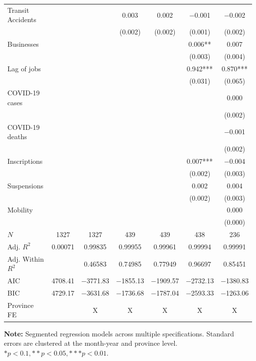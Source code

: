 \documentclass[11pt,a4paper]{article}\usepackage[]{graphicx}\usepackage[]{xcolor}
\begin{document}
\begin{table}[htbp!]
\begin{tabular}[t]{lcccccc}
Transit Accidents &  &  & \num{0.003} & \num{0.002} & \num{-0.001} & \num{-0.002}\\
 &  &  & (\num{0.002}) & (\num{0.002}) & (\num{0.001}) & (\num{0.002})\\
Businesses &  &  &  &  & \num{0.006}** & \num{0.007}\\
 &  &  &  &  & (\num{0.003}) & (\num{0.004})\\
Lag of jobs &  &  &  &  & \num{0.942}*** & \num{0.870}***\\
 &  &  &  &  & (\num{0.031}) & (\num{0.065})\\
COVID-19 cases &  &  &  &  &  & \num{0.000}\\
 &  &  &  &  &  & \vphantom{1} (\num{0.002})\\
COVID-19 deaths &  &  &  &  &  & \num{-0.001}\\
 &  &  &  &  &  & (\num{0.002})\\
Inscriptions &  &  &  &  & \num{0.007}*** & \num{-0.004}\\
 &  &  &  &  & (\num{0.002}) & \vphantom{1} (\num{0.003})\\
Suspensions &  &  &  &  & \num{0.002} & \num{0.004}\\
 &  &  &  &  & (\num{0.002}) & (\num{0.003})\\
Mobility &  &  &  &  &  & \num{0.000}\\
 &  &  &  &  &  & (\num{0.000})\\
\midrule
$N$ & \num{1327} & \num{1327} & \num{439} & \num{439} & \num{438} & \num{236}\\
Adj. $R^2$ & \num{0.00071} & \num{0.99835} & \num{0.99955} & \num{0.99961} & \num{0.99994} & \num{0.99991}\\
Adj. Within $R^2$ &  & \num{0.46583} & \num{0.74985} & \num{0.77949} & \num{0.96697} & \num{0.85451}\\
AIC & \num{4708.41} & \num{-3771.83} & \num{-1855.13} & \num{-1909.57} & \num{-2732.13} & \num{-1380.83}\\
BIC & \num{4729.17} & \num{-3631.68} & \num{-1736.68} & \num{-1787.04} & \num{-2593.33} & \num{-1263.06}\\
Province FE &  & X & X & X & X & X\\
\bottomrule
\end{tabular}


\vspace{0.3cm}
\textbf{Note:} Segmented regression models across multiple specifications. Standard errors are clustered at the month-year and province level.\\
$ *p < 0.1, **p < 0.05, ***p < 0.01.$
\end{table}
\end{document}
